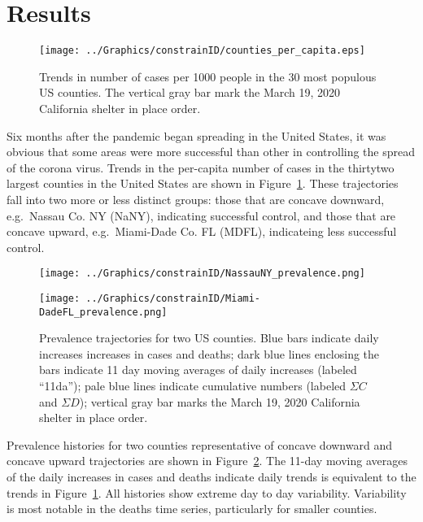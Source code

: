 \documentclass[12pt,letterpaper]{article}
\newcommand\EG{e.g.\ }
\begin{document}
\section*{Results}

\begin{figure}
\begin{center}
\texttt{[image: ../Graphics/constrainID/counties\_per\_capita.eps]}
\end{center}
\caption{\label{fig:percap}
Trends in number of cases per 1000 people in the 30 most populous US
counties.
The vertical gray bar mark the March 19, 2020 California shelter in place order.
}
\end{figure}


Six months after the pandemic began spreading in the United States, it
was obvious that some areas were more successful than other
in controlling the spread of the corona virus.
Trends in the per-capita number of cases in the thirtytwo largest
counties in the
United States are shown in Figure~\ref{fig:percap}.
These trajectories fall into two more or less distinct groups: those
that are concave downward, \EG Nassau Co. NY (NaNY), indicating
successful control, and those that are
concave upward, \EG Miami-Dade Co. FL (MDFL), indicateing less
successful control.


\begin{figure}
{\scriptsize
\begin{center}
\texttt{[image: ../Graphics/constrainID/NassauNY\_prevalence.png]}
 
\vspace{0.25truein}

\texttt{[image: ../Graphics/constrainID/Miami-DadeFL\_prevalence.png]}
\end{center}
}
\caption{\label{fig:prev}
Prevalence trajectories for two US counties.
Blue bars indicate daily increases increases in cases and deaths;
dark blue lines enclosing the bars indicate 11 day moving averages of
daily increases (labeled ``11da'');
pale blue lines indicate cumulative numbers (labeled $\Sigma C$ and
$\Sigma D$); 
vertical gray bar marks the March 19, 2020 California shelter in place order.
}
\end{figure}

Prevalence histories for two counties representative of concave
downward and concave upward trajectories are shown in
Figure~\ref{fig:prev}. The 11-day moving averages of the daily
increases in cases and deaths indicate daily trends is equivalent to
the trends in Figure~\ref{fig:percap}.
All histories show extreme day to day variability.
Variability is most notable in the deaths
time series, particularly for smaller counties.
\end{document}
